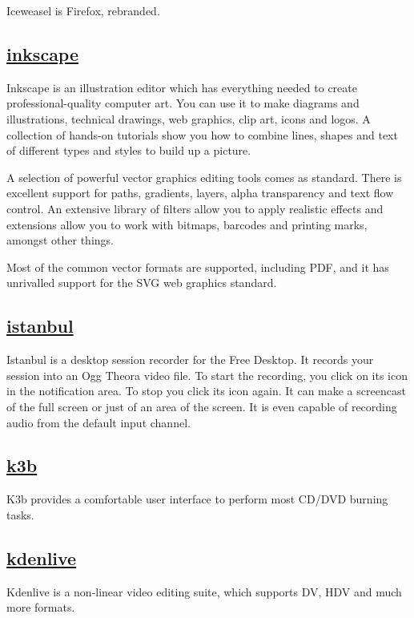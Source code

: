  Iceweasel is Firefox, rebranded.

\subsection{\href{http://www.inkscape.org/}{inkscape}}

 Inkscape is an illustration editor which has everything needed to
 create professional-quality computer art. You can use it to make
 diagrams and illustrations, technical drawings, web graphics, clip art,
 icons and logos. A collection of hands-on tutorials show you how to
 combine lines, shapes and text of different types and styles to build
 up a picture.
 
 A selection of powerful vector graphics editing tools comes as
 standard. There is excellent support for paths, gradients, layers,
 alpha transparency and text flow control. An extensive library of
 filters allow you to apply realistic effects and extensions allow you
 to work with bitmaps, barcodes and printing marks, amongst other things.
 
 Most of the common vector formats are supported, including PDF,
 and it has unrivalled support for the
 SVG web graphics standard.

\subsection{\href{http://live.gnome.org/Istanbul}{istanbul}}

 Istanbul is a desktop session recorder for the Free Desktop.
 It records your session into an Ogg Theora video file.
 To start the recording, you click on its icon in the
 notification area. To stop you click its icon again.
 It can make a screencast of the full screen or just of an
 area of the screen. It is even capable of recording audio
 from the default input channel.
 
\subsection{\href{http://www.k3b.org}{k3b}}

 K3b provides a comfortable user interface to perform most CD/DVD burning
 tasks.

\subsection{\href{http://www.kdenlive.org/}{kdenlive}}

 Kdenlive is a non-linear video editing suite, which supports DV, HDV and
 much more formats.

